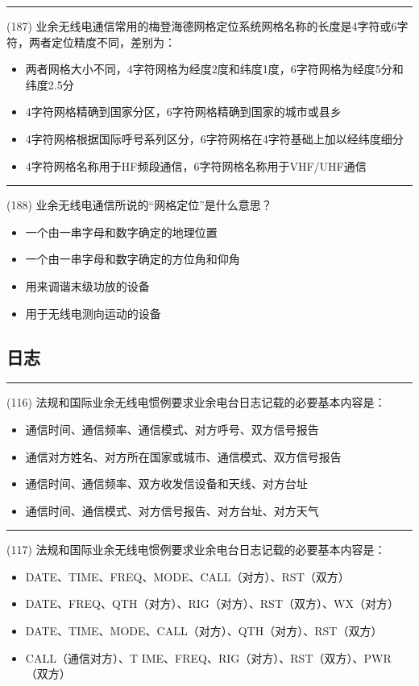 \documentclass[twocolumn,hyperref,UTF8]{ctexart}  %
\begin{document}
\noindent\rule{0.5\textwidth}{1pt}
\heiti (187) 业余无线电通信常用的梅登海德网格定位系统网格名称的长度是4字符或6字符，两者定位精度不同，差别为： \songti {\color{gray} [LK0864] }
\begin{itemize}
	\item  两者网格大小不同，4字符网格为经度2度和纬度1度，6字符网格为经度5分和纬度2.5分
	\item  4字符网格精确到国家分区，6字符网格精确到国家的城市或县乡
	\item  4字符网格根据国际呼号系列区分，6字符网格在4字符基础上加以经纬度细分
	\item  4字符网格名称用于HF频段通信，6字符网格名称用于VHF/UHF通信
\end{itemize}


\noindent\rule{0.5\textwidth}{1pt}
\heiti (188) 业余无线电通信所说的“网格定位”是什么意思？ \songti {\color{gray} [LK1208] }
\begin{itemize}
	\item  一个由一串字母和数字确定的地理位置
	\item  一个由一串字母和数字确定的方位角和仰角
	\item  用来调谐末级功放的设备
	\item  用于无线电测向运动的设备
\end{itemize}


\clearpage
\subsection{日志}


\noindent\rule{0.5\textwidth}{1pt}
\heiti (116) 法规和国际业余无线电惯例要求业余电台日志记载的必要基本内容是： \songti {\color{gray} [LK0075] }
\begin{itemize}
	\item  通信时间、通信频率、通信模式、对方呼号、双方信号报告
	\item  通信对方姓名、对方所在国家或城市、通信模式、双方信号报告
	\item  通信时间、通信频率、双方收发信设备和天线、对方台址
	\item  通信时间、通信模式、对方信号报告、对方台址、对方天气
\end{itemize}


\noindent\rule{0.5\textwidth}{1pt}
\heiti (117) 法规和国际业余无线电惯例要求业余电台日志记载的必要基本内容是： \songti {\color{gray} [LK0076] }
\begin{itemize}
	\item  DATE、TIME、FREQ、MODE、CALL（对方）、RST（双方）
	\item  DATE、FREQ、QTH（对方）、RIG（对方）、RST（双方）、WX（对方）
	\item  DATE、TIME、MODE、CALL（对方）、QTH（对方）、RST（双方）
	\item  CALL（通信对方）、T IME、FREQ、RIG（对方）、RST（双方）、PWR（双方）
\end{itemize}
\end{document}
